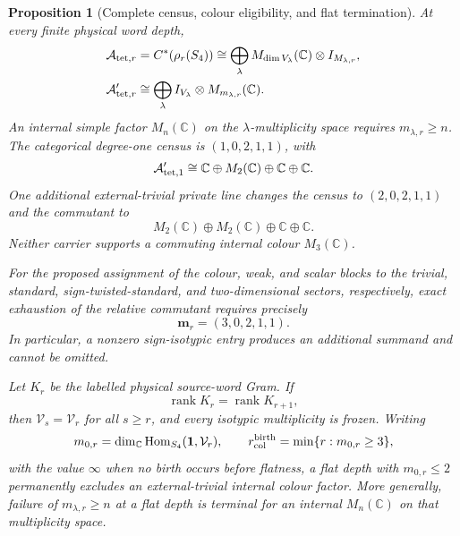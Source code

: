 \documentclass[11pt]{article}
\numberwithin{equation}{section}
\newtheorem{proposition}[theorem]{Proposition}
\theoremstyle{definition}
\theoremstyle{remark}
\newcommand{\C}{\mathbb C}
\newcommand{\rank}{\operatorname{rank}}
\newcommand{\Hom}{\operatorname{Hom}}
\newcommand{\A}{\mathcal A}
\begin{document}
\begin{proposition}[Complete census, colour eligibility, and flat termination]
\label{thm:active-isotypic}
At every finite physical word depth,
\begin{align}
 \A_{{\rm tet},r}&=C^*(\rho_r(S_4))
   \cong\bigoplus_\lambda M_{\dim V_\lambda}(\C)\otimes I_{M_{\lambda,r}},
 \label{eq:external-isotypic}\\
 \A_{{\rm tet},r}'&\cong\bigoplus_\lambda
   I_{V_\lambda}\otimes M_{m_{\lambda,r}}(\C).
 \label{eq:external-isotypic-commutant}
\end{align}
An internal simple factor $M_n(\C)$ on the $\lambda$-multiplicity space
requires $m_{\lambda,r}\ge n$.  The categorical degree-one census is
$(1,0,2,1,1)$, with
\begin{equation}
 \A_{{\rm tet},1}'\cong\C\oplus M_2(\C)\oplus\C\oplus\C.
 \label{eq:degree-one-commutant}
\end{equation}
One additional external-trivial private line changes the census to
$(2,0,2,1,1)$ and the commutant to
\begin{equation}
 M_2(\C)\oplus M_2(\C)\oplus\C\oplus\C.
 \label{eq:degree-one-private-commutant}
\end{equation}
Neither carrier supports a commuting internal colour $M_3(\C)$.

For the proposed assignment of the colour, weak, and scalar blocks to the
trivial, standard, sign-twisted-standard, and two-dimensional sectors,
respectively, exact exhaustion of the relative commutant requires precisely
\begin{equation}
 \bm m_r=(3,0,2,1,1).
 \label{eq:SM-complete-census}
\end{equation}
In particular, a nonzero sign-isotypic entry produces an additional summand
and cannot be omitted.

Let $K_r$ be the labelled physical source-word Gram.  If
\begin{equation}
 \rank K_r=\rank K_{r+1},\label{eq:word-flatness}
\end{equation}
then $\mathcal V_s=\mathcal V_r$ for all $s\ge r$, and every isotypic
multiplicity is frozen.  Writing
\begin{equation}
 m_{0,r}=\dim_\C\Hom_{S_4}(\mathbf1,\mathcal V_r),\qquad
 r_{\rm col}^{\rm birth}=\min\{r:m_{0,r}\ge3\},
 \label{eq:colour-birth-depth}
\end{equation}
with the value $\infty$ when no birth occurs before flatness, a flat depth
with $m_{0,r}\le2$ permanently excludes an external-trivial internal colour
factor.  More generally, failure of $m_{\lambda,r}\ge n$ at a flat depth is
terminal for an internal $M_n(\C)$ on that multiplicity space.
\end{proposition}
\end{document}
